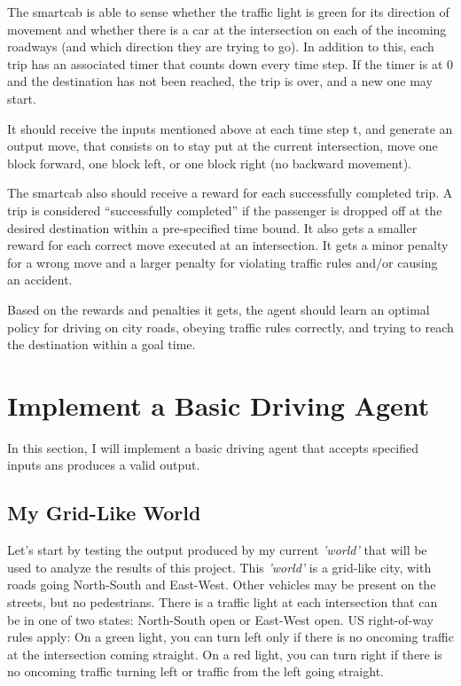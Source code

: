 \documentclass[a4paper]{article}
\begin{document}
The smartcab is able to sense whether the traffic light is green for its direction of movement and whether there is a car at the intersection on each of the incoming roadways (and which direction they are trying to go). In addition to this, each trip has an associated timer that counts down every time step. If the timer is at 0 and the destination has not been reached, the trip is over, and a new one may start.

It should receive the inputs mentioned above at each time step t, and generate an output move, that consists on to stay put at the current intersection, move one block forward, one block left, or one block right (no backward movement).

The smartcab also should receive a reward for each successfully completed trip. A trip is considered “successfully completed” if the passenger is dropped off at the desired destination within a pre-specified time bound. It also gets a smaller reward for each correct move executed at an intersection. It gets a minor penalty for a wrong move and a larger penalty for violating traffic rules and/or causing an accident.

Based on the rewards and penalties it gets, the agent should learn an optimal policy for driving on city roads, obeying traffic rules correctly, and trying to reach the destination within a goal time.


\section{Implement a Basic Driving Agent}
\label{sec:implement_driving_agent}
In this section, I will implement a basic driving agent that accepts specified inputs ans produces a valid output.

\subsection{My Grid-Like World}
Let's start by testing the output produced by my current \textit{'world'} that will be used to analyze the results of this project. This \textit{'world'} is a grid-like city, with roads going North-South and East-West. Other vehicles may be present on the streets, but no pedestrians. There is a traffic light at each intersection that can be in one of two states: North-South open or East-West open. US right-of-way rules apply: On a green light, you can turn left only if there is no oncoming traffic at the intersection coming straight. On a red light, you can turn right if there is no oncoming traffic turning left or traffic from the left going straight.
\end{document}
